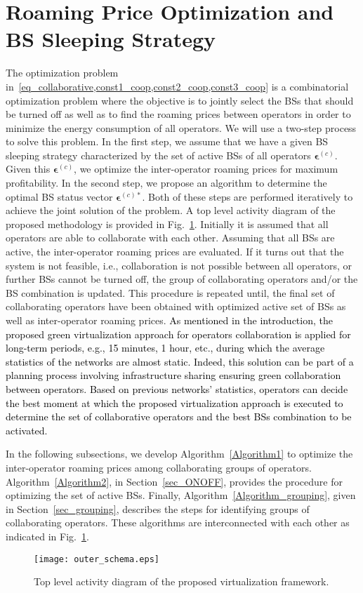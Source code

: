 \documentclass[10pt, letter, twocolumn]{IEEEtran}
\begin{document}
\section{Roaming Price Optimization and BS Sleeping Strategy} \label{green_solution}
The optimization problem in~\cref{eq_collaborative,const1_coop,const2_coop,const3_coop} is a combinatorial optimization problem where the objective is to jointly select the BSs that should be turned off as well as to find the roaming prices between operators in order to minimize the energy consumption of all operators. We will use a two-step process to solve this problem. In the first step, we assume that we have a given BS sleeping strategy characterized by  the set of active BSs of all operators $\boldsymbol{\epsilon}^{(c)}$. Given this $\boldsymbol{\epsilon}^{(c)}$, we optimize the inter-operator roaming prices for maximum profitability. In the second step, we propose an algorithm to determine the optimal BS status vector $\boldsymbol{\epsilon}^{(c)*}$. Both of these steps are performed iteratively to achieve the joint solution of the problem.  A top level activity diagram of the proposed methodology is provided in Fig.~\ref{schema}. Initially it is assumed that all operators are able to collaborate with each other. Assuming that all BSs are active, the inter-operator roaming prices are evaluated. If it turns out that the system is not feasible, i.e., collaboration is not possible between all operators, or further BSs cannot be turned off, the group of collaborating operators and/or the BS combination is updated. This procedure is repeated until, the final set of collaborating operators have been obtained with optimized active set of BSs as well as inter-operator roaming prices. \textcolor{black}{As mentioned in the introduction, the proposed green virtualization approach for operators collaboration is applied for long-term periods, e.g., 15 minutes, 1 hour, etc., during which the average statistics of the networks are almost static. Indeed, this solution can be part of a planning process involving infrastructure sharing ensuring green collaboration between operators. Based on previous networks' statistics, operators can decide the best moment at which the proposed virtualization approach is executed to determine the set of collaborative operators and the best BSs combination to be activated.}

In the following subsections, we develop Algorithm~\ref{Algorithm1} to optimize the inter-operator roaming prices among collaborating groups of operators. Algorithm~\ref{Algorithm2}, in Section~\ref{sec_ONOFF}, provides the procedure for optimizing the set of active BSs. Finally, Algorithm~\ref{Algorithm_grouping}, given in Section~\ref{sec_grouping}, describes the steps for identifying groups of collaborating operators. These algorithms are interconnected with each other as indicated in Fig.~\ref{schema}.
\begin{figure}[t]
  \centering
  \texttt{[image: outer\_schema.eps]}
  \caption{Top level activity diagram of the proposed virtualization framework.}\label{schema}
\end{figure}
\end{document}
